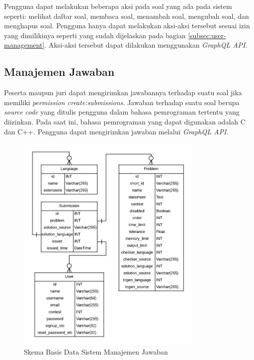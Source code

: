 
\par Pengguna dapat melakukan beberapa aksi pada soal yang ada pada sistem seperti: melihat daftar soal, membaca soal, menambah soal, mengubah soal, dan menghapus soal. Pengguna hanya dapat melakukan aksi-aksi tersebut sesuai izin yang dimilikinya seperti yang sudah dijelaskan pada bagian \ref{subsec:user-management}. Aksi-aksi tersebut dapat dilakukan menggunakan \textit{GraphQL API}.

\subsection{Manajemen Jawaban}

\par Peserta maupun juri dapat mengirimkan jawabannya terhadap suatu soal jika memiliki \textit{permission create:submissions}. Jawaban terhadap suatu soal berupa \textit{source code} yang ditulis pengguna dalam bahasa pemrograman tertentu yang diizinkan. Pada saat ini, bahasa pemrograman yang dapat digunakan adalah C dan C++. Pengguna dapat mengirimkan jawaban melalui \textit{GraphQL API}.

\begin{figure}[ht!]
    \centering
    \includegraphics[width=0.8\textwidth]{images/submission-schema}
    \caption{Skema Basis Data Sistem Manajemen Jawaban}
    \label{fig:submission-schema}
\end{figure}

